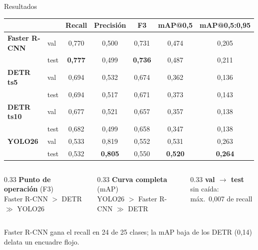 \documentclass[aspectratio=169,10pt]{beamer}
\newcommand{\gris}[1]{{\color{cMuted}#1}}
\newcommand{\frcnn}{{\color{cFRCNN}\textbf{Faster R-CNN}}}
\newcommand{\detrA}{{\color{cDETR}\textbf{DETR ts5}}}
\newcommand{\detrB}{{\color{cDETRb}\textbf{DETR ts10}}}
\newcommand{\yolo}{{\color{cYOLO}\textbf{YOLO26}}}
\begin{document}
\begin{frame}{Resultados}
  \centering
  \small
  \begin{tabular}{@{}llccccc@{}}
    \toprule
    & & \textbf{Recall} & \textbf{Precisión} & \textbf{F3}
    & \textbf{mAP@0,5} & \textbf{mAP@0,5:0,95} \\
    \midrule
    \frcnn & val  & 0,770 & 0,500 & 0,731 & 0,474 & 0,205 \\
                            & test & \textbf{0,777} & 0,499 & \textbf{0,736} & 0,487 & 0,211 \\
    \addlinespace
    \detrA                  & val  & 0,694 & 0,532 & 0,674 & 0,362 & 0,136 \\
                            & test & 0,694 & 0,517 & 0,671 & 0,373 & 0,143 \\
    \addlinespace
    \detrB                  & val  & 0,677 & 0,521 & 0,657 & 0,357 & 0,138 \\
                            & test & 0,682 & 0,499 & 0,658 & 0,347 & 0,138 \\
    \addlinespace
    \yolo                   & val  & 0,533 & 0,819 & 0,552 & 0,531 & 0,263 \\
                            & test & 0,532 & \textbf{0,805} & 0,550 & \textbf{0,520} & \textbf{0,264} \\
    \bottomrule
  \end{tabular}

  \medskip
  \footnotesize
  \begin{columns}[T]
    \begin{column}{0.33\textwidth}
      \textbf{Punto de operación} \gris{(F3)}\\
      Faster R-CNN $>$ DETR $\gg$ YOLO26
    \end{column}
    \begin{column}{0.33\textwidth}
      \textbf{Curva completa} \gris{(mAP)}\\
      YOLO26 $>$ Faster R-CNN $\gg$ DETR
    \end{column}
    \begin{column}{0.33\textwidth}
      \textbf{val $\rightarrow$ test}\\
      sin caída: máx.\ 0,007 de recall
    \end{column}
  \end{columns}
  \medskip
  \gris{Faster R-CNN gana el recall en 24 de 25 clases; la mAP baja de los DETR
  (0,14) delata un encuadre flojo.}
\end{frame}
\end{document}
